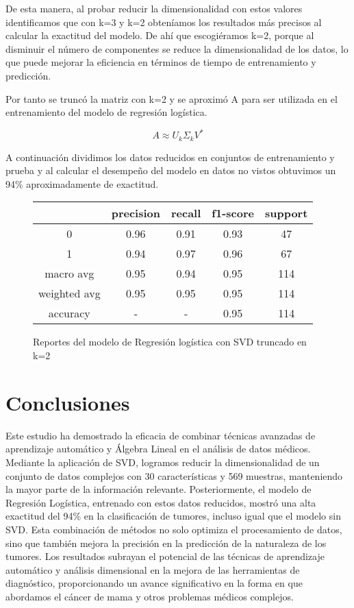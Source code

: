 \documentclass[a4paper,10pt,twocolumn]{article}
\begin{document}
De esta manera, al probar reducir la dimensionalidad con estos valores identificamos que con k=3 y k=2 obteníamos los resultados más precisos al calcular la exactitud del modelo. De ahí que escogiéramos k=2, porque al disminuir el número de componentes se reduce la dimensionalidad de los datos, lo que puede mejorar la eficiencia en términos de tiempo de entrenamiento y predicción.

Por tanto se truncó la matriz con k=2 y se aproximó A para ser utilizada en el entrenamiento del modelo de regresión logística.

\[
A \approx U_k \Sigma_k V^*
\]

A continuación dividimos los datos reducidos en conjuntos de entrenamiento y prueba y al calcular el desempeño del modelo en datos no vistos obtuvimos un 94\% aproximadamente de exactitud.
	\begin{figure}[h!]%
		\begin{center}
			\begin{tabular}{|c|c|c|c|c|} \hline
			 			& precision 	& recall& f1-score &support	\\ \hline
			0 			&  	0.96		& 0.91 	&0.93	&47	\\ \hline
			1			& 	0.94		& 0.97	&0.96&67	\\ \hline
    
   macro avg 			&  	0.95		& 0.94 	&0.95	&114	\\ \hline
			weighted avg			& 0.95	& 0.95	&0.95&114	\\ \hline
   accuracy &- &-& 0.95&114\\ \hline
			\end{tabular}
		\caption{Reportes del modelo de Regresión logística  con SVD truncado en k=2 \label{fig:ex}}
		\end{center}
		\end{figure}
   
\section{Conclusiones}
Este estudio ha demostrado la eficacia de combinar técnicas avanzadas de aprendizaje automático y Álgebra Lineal en el análisis de datos médicos. Mediante la aplicación de SVD, logramos reducir la dimensionalidad de un conjunto de datos complejos con 30 características y 569 muestras, manteniendo la mayor parte de la información relevante. Posteriormente, el modelo de Regresión Logística, entrenado con estos datos reducidos, mostró una alta exactitud del 94\% en la clasificación de tumores, incluso igual que el modelo sin SVD. Esta combinación de métodos no solo optimiza el procesamiento de datos, sino que también mejora la precisión en la predicción de la naturaleza de los tumores. Los resultados subrayan el potencial de las técnicas de aprendizaje automático y análisis dimensional en la mejora de las herramientas de diagnóstico, proporcionando un avance significativo en la forma en que abordamos el cáncer de mama y otros problemas médicos complejos.
\end{document}
